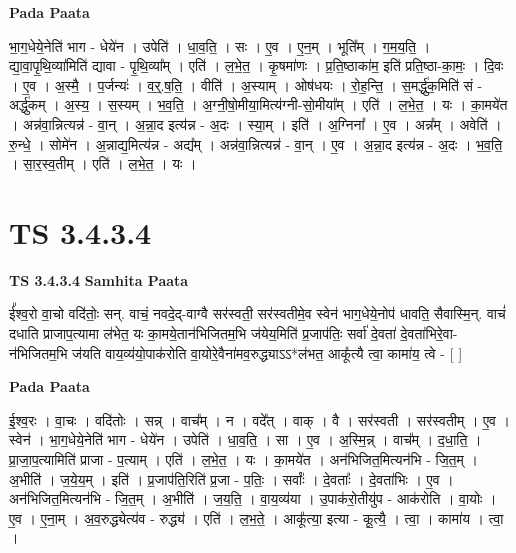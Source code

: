 \documentclass[17pt]{extarticle}
\begin{document}
\textbf{Pada Paata} \newline

भा॒ग॒धेये॒नेति॑ भाग - धेये॑न । उपेति॑ । धा॒व॒ति॒ । सः । ए॒व । ए॒न॒म् । भूति᳚म् । ग॒म॒य॒ति॒ । द्या॒वा॒पृ॒थि॒व्या॑मिति॑ द्यावा - पृ॒थि॒व्या᳚म् । एति॑ । ल॒भे॒त॒ । कृ॒षमा॑णः । प्र॒ति॒ष्ठाका॑म॒ इति॑ प्रति॒ष्ठा-का॒मः॒ । दि॒वः । ए॒व । अ॒स्मै॒ । प॒र्जन्यः॑ । व॒र्॒.ष॒ति॒ । वीति॑ । अ॒स्याम् । ओष॑धयः । रो॒ह॒न्ति॒ । स॒मर्द्धु॑क॒मिति॑ सं - अर्द्धु॑कम् । अ॒स्य॒ । स॒स्यम् । भ॒व॒ति॒ । अ॒ग्नी॒षो॒मीया॒मित्य॑ग्नी-सो॒मीया᳚म् । एति॑ । ल॒भे॒त॒ । यः । का॒मये॑त । अन्न॑वा॒न्नित्यन्न॑ - वा॒न् । अ॒न्ना॒द इत्य॑न्न - अ॒दः । स्या॒म् । इति॑ । अ॒ग्निना᳚ । ए॒व । अन्न᳚म् । अवेति॑ । रु॒न्धे॒ । सोमे॑न । अ॒न्नाद्य॒मित्य॑न्न - अद्य᳚म् । अन्न॑वा॒न्नित्यन्न॑ - वा॒न् । ए॒व । अ॒न्ना॒द इत्य॑न्न - अ॒दः । भ॒व॒ति॒ । सा॒र॒स्व॒तीम् । एति॑ । ल॒भे॒त॒ । यः ।  \newline




\section*{ TS 3.4.3.4 }

\textbf{TS 3.4.3.4 } \newline
\textbf{Samhita Paata} \newline

ई᳚श्व॒रो वा॒चो वदि॑तोः॒ सन्. वाचं॒ नवदे॒द्-वाग्वै सर॑स्वती॒ सर॑स्वतीमे॒व स्वेन॑ भाग॒धेये॒नोप॑ धावति॒ सैवास्मि॒न्. वाचं॑ दधाति प्राजाप॒त्यामा ल॑भेत॒ यः का॒मये॒तान॑भिजितम॒भि ज॑येय॒मिति॑ प्र॒जाप॑तिः॒ सर्वा॑ दे॒वता॑ दे॒वता॑भिरे॒वा-न॑भिजितम॒भि ज॑यति वाय॒व्य॑यो॒पाक॑रोति वा॒योरे॒वैना॑मव॒रुद्ध्याऽऽ*ल॑भत॒ आकू᳚त्यै त्वा॒ कामा॑य॒ त्वे - [  ] \newline

\textbf{Pada Paata} \newline

ई॒श्व॒रः । वा॒चः । वदि॑तोः । सन्न् । वाच᳚म् । न । वदे᳚त् । वाक् । वै । सर॑स्वती । सर॑स्वतीम् । ए॒व । स्वेन॑ । भा॒ग॒धेये॒नेति॑ भाग - धेये॑न । उपेति॑ । धा॒व॒ति॒ । सा । ए॒व । अ॒स्मि॒न्न् । वाच᳚म् । द॒धा॒ति॒ । प्रा॒जा॒प॒त्यामिति॑ प्राजा - प॒त्याम् । एति॑ । ल॒भे॒त॒ । यः । का॒मये॑त । अन॑भिजित॒मित्यन॑भि - जि॒त॒म् । अ॒भीति॑ । ज॒ये॒य॒म् । इति॑ । प्र॒जाप॑ति॒रिति॑ प्र॒जा - प॒तिः॒ । सर्वाः᳚ । दे॒वताः᳚ । दे॒वता॑भिः । ए॒व । अन॑भिजित॒मित्यन॑भि - जि॒त॒म् । अ॒भीति॑ । ज॒य॒ति॒ । वा॒य॒व्य॑या । उ॒पाक॑रो॒तीयु॑प - आक॑रोति । वा॒योः । ए॒व । ए॒ना॒म् । अ॒व॒रुद्ध्येत्य॑व - रुद्ध्य॑ । एति॑ । ल॒भ॒ते॒ । आकू᳚त्या॒ इत्या - कू॒त्यै॒ । त्वा॒ । कामा॑य । त्वा॒ ।  \newline
\end{document}
